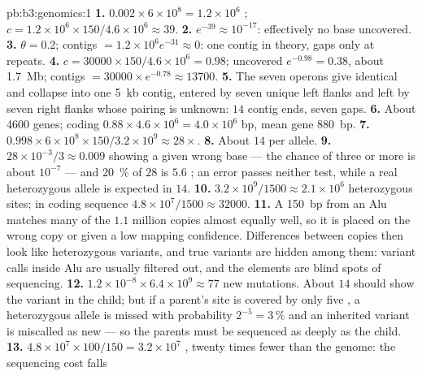 \begin{solution}{pb:b3:genomics:1}
\textbf{1.} $0.002\times 6\times 10^{8} = 1.2\times 10^{6}$ ;
$c = 1.2\times 10^{6}\times 150/4.6\times 10^{6} \approx 39$.
\textbf{2.} $e^{-39} \approx 10^{-17}$: effectively no base uncovered.
\textbf{3.} $\theta = 0.2$; contigs $= 1.2\times 10^{6} e^{-31} \approx
0$: one contig in theory, gaps only at repeats.
\textbf{4.} $c = \num{30000}\times 150/4.6\times 10^{6} = 0.98$;
uncovered $e^{-0.98} = 0.38$, about \qty{1.7}{Mb}; contigs $= \num{30000}
\times e^{-0.78} \approx \num{13700}$.
\textbf{5.} The seven operons give identical  and collapse into one
\qty{5}{kb} contig, entered by seven unique left flanks and left by
seven right flanks whose pairing is unknown: $14$ contig ends, seven
gaps.
\textbf{6.} About \num{4600} genes; coding $0.88\times 4.6\times 10^{6}
= 4.0\times 10^{6}$ bp, mean gene \qty{880}{bp}.
\textbf{7.} $0.998\times 6\times 10^{8}\times 150/3.2\times 10^{9}
\approx 28\times$.
\textbf{8.} About $14$  per allele.
\textbf{9.} $28\times 10^{-3}/3 \approx 0.009$  showing a given
wrong base --- the chance of three or more is about $10^{-7}$ --- and
\qty{20}{\%} of $28$ is $5.6$ ; an error passes neither test,
while a real heterozygous allele is expected in $14$.
\textbf{10.} $3.2\times 10^{9}/1500 \approx 2.1\times 10^{6}$
heterozygous sites; in coding sequence $4.8\times 10^{7}/1500 \approx
\num{32000}$.
\textbf{11.} A \qty{150}{bp}  from an Alu matches many of the $1.1$
million copies almost equally well, so it is placed on the wrong copy
or given a low mapping confidence. Differences between copies then
look like heterozygous variants, and true variants are hidden among
them: variant calls inside Alu are usually filtered out, and the
elements are blind spots of  sequencing.
\textbf{12.} $1.2\times 10^{-8}\times 6.4\times 10^{9} \approx 77$ new
mutations. About $14$  should show the variant in the child; but
if a parent's site is covered by only five , a heterozygous allele
is missed with probability $2^{-5} = 3\,\%$ and an inherited variant is
miscalled as new --- so the parents must be sequenced as deeply as the
child.
\textbf{13.} $4.8\times 10^{7}\times 100/150 = 3.2\times 10^{7}$ ,
twenty times fewer than the genome: the sequencing cost falls

\end{solution}
